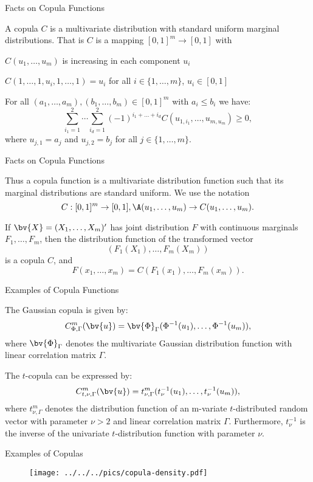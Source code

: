 {Facts on Copula Functions}

A copula $C$ is a multivariate distribution with standard uniform
marginal distributions. That is $C$ is a mapping $[0,1]^m
\rightarrow [0,1]$ with
\item<1-> $C(u_1,\ldots,u_m)$ is increasing in each component $u_i$
\item<2-> $C(1,\ldots,1,u_i,1,\ldots,1)=u_i$ for all
$i\in\{1,\ldots,m\}$, $u_i\in[0,1]$
\item<3-> For all $(a_1,\ldots,a_m), (b_1,\ldots,b_m)\in[0,1]^m$ with
$a_i\leq b_i$ we have:
$$
\sum_{i_1=1}^2\cdots\sum_{i_d=1}^2(-1)^{i_1+\ldots+i_d}C(u_{1,i_1},\ldots,u_{m,u_m})
\geq 0,
$$
where $u_{j,1}=a_j$ and $u_{j,2}=b_j$ for all $j \in
\{1,\ldots,m\}$.

{Facts on Copula Functions}

Thus a copula function is a multivariate distribution function
such that its marginal distributions are standard uniform. We use
the notation
$$
C:[0,1]^m \rightarrow [0,1], \A (u_1, \ldots, u_m)\rightarrow
C(u_1, \ldots, u_m).
$$

If $\bv{X}=(X_1,\ldots,X_m)'$ has joint distribution $F$ with
continuous marginals $F_1,\ldots,F_m$, then the distribution
function of the transformed vector
$$
(F_1(X_1),\ldots,F_m(X_m))
$$
is a copula $C$, and
$$
F(x_1,\ldots,x_m)=C(F_1(x_1),\ldots,F_m(x_m)).
$$

{Examples of Copula Functions}

The Gaussian copula is given by:
$$
C^m_{\Phi,\Gamma}(\bv{u})=\bv{\Phi}_{\Gamma}(\Phi^{-1}(u_1),\ldots,\Phi^{-1}(u_m)),
$$
where $\bv{\Phi}_{\Gamma}$ denotes the multivariate Gaussian
distribution function with linear correlation matrix $\Gamma$.

The $t$-copula can be expressed by:
$$
C^m_{t,\nu,\Gamma}(\bv{u})=t^m_{\nu,\Gamma}(t_\nu^{-1}(u_1),\ldots,t_{\nu}^{-1}(u_m)),
$$
where $t^m_{\nu,\Gamma}$ denotes the distribution function of an
m-variate $t$-distributed random vector with parameter $\nu>2$ and
linear correlation matrix $\Gamma$. Furthermore, $t^{-1}_\nu$ is
the inverse of  the univariate $t$-distribution function with
parameter $\nu$.

{Examples of Copulas}

\begin{center}
\begin{figure}
\texttt{[image: ../../../pics/copula-density.pdf]}
\end{figure}
\end{center}

